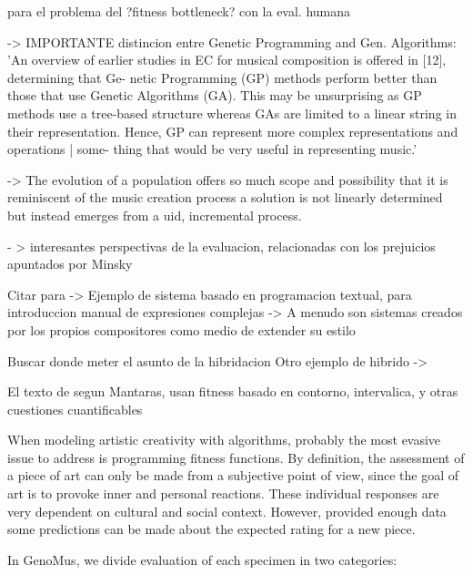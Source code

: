 \documentclass{article}
\begin{document}
{\color{red}


\cite{Biles94genjam} para el problema del ?fitness bottleneck? con la eval. humana


\cite{Burton1999}  -> IMPORTANTE distincion entre Genetic Programming and Gen. Algorithms: 'An overview of earlier
studies in EC for musical composition is offered in [12], determining that Ge-
netic Programming (GP) methods perform better than those that use Genetic
Algorithms (GA). This may be unsurprising as GP methods use a tree-based
structure whereas GAs are limited to a linear string in their representation.
Hence, GP can represent more complex representations and operations | some-
thing that would be very useful in representing music.'





\cite{LimitHuman} -> The evolution of a population offers so much scope and possibility
that it is reminiscent of the music creation process a solution is not linearly
determined but instead emerges from a 
uid, incremental process.



\cite{DBLP:journals/aim/Minsky82} - > interesantes perspectivas de la
evaluacion, relacionadas con los prejuicios apuntados por Minsky

Citar \cite{BurtonHybrid} para
-> Ejemplo de sistema basado en programacion textual, para introduccion manual de expresiones complejas
	-> A menudo son sistemas creados por los propios compositores como medio de extender su estilo
	
	
Buscar donde meter el asunto de la hibridacion
Otro ejemplo de hibrido -> \cite{crawford2015algorithmic}

El texto de \cite{Papadopoulos98agenetic}
segun Mantaras, usan fitness basado en contorno, intervalica, y otras cuestiones cuantificables

}

When modeling artistic creativity with algorithms, probably the most evasive issue to address is programming fitness functions. By definition, the assessment of a piece of art can only be made from a subjective point of view, since the goal of art is to provoke inner and personal reactions. These individual responses are very dependent on cultural and social context. However, provided enough data some predictions can be made about the expected rating for a new piece.

In GenoMus, we divide evaluation of each specimen in two categories:
\end{document}
